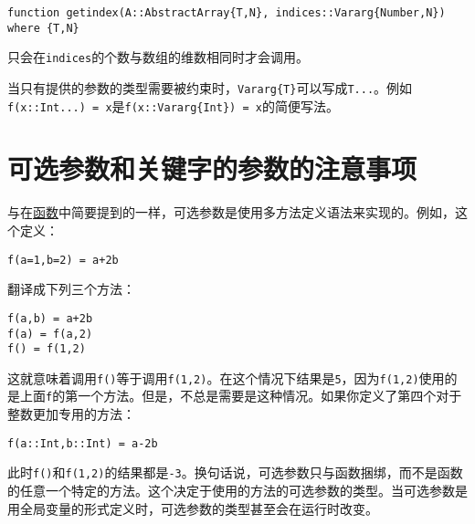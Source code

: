 \begin{verbatim}
function getindex(A::AbstractArray{T,N}, indices::Vararg{Number,N}) where {T,N}
\end{verbatim}



只会在\texttt{indices}的个数与数组的维数相同时才会调用。



当只有提供的参数的类型需要被约束时，\texttt{Vararg\{T\}}可以写成\texttt{T...}。例如\texttt{f(x::Int...) = x}是\texttt{f(x::Vararg\{Int\}) = x}的简便写法。



\hypertarget{6114459498123607412}{}


\section{可选参数和关键字的参数的注意事项}



与在\hyperlink{645008301484218813}{函数}中简要提到的一样，可选参数是使用多方法定义语法来实现的。例如，这个定义：




\begin{verbatim}
f(a=1,b=2) = a+2b
\end{verbatim}



翻译成下列三个方法：




\begin{verbatim}
f(a,b) = a+2b
f(a) = f(a,2)
f() = f(1,2)
\end{verbatim}



这就意味着调用\texttt{f()}等于调用\texttt{f(1,2)}。在这个情况下结果是\texttt{5}，因为\texttt{f(1,2)}使用的是上面\texttt{f}的第一个方法。但是，不总是需要是这种情况。如果你定义了第四个对于整数更加专用的方法：




\begin{verbatim}
f(a::Int,b::Int) = a-2b
\end{verbatim}



此时\texttt{f()}和\texttt{f(1,2)}的结果都是\texttt{-3}。换句话说，可选参数只与函数捆绑，而不是函数的任意一个特定的方法。这个决定于使用的方法的可选参数的类型。当可选参数是用全局变量的形式定义时，可选参数的类型甚至会在运行时改变。



